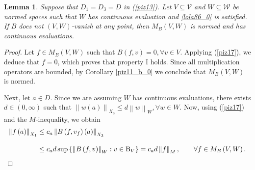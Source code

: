 \documentclass[14pt, a4paper]{article}  %
\newcounter{property}
\providecommand{\llave}[1]{\left\lbrace #1\right\rbrace }
\providecommand{\pare}[1]{\left( #1\right) }
\providecommand{\norm}[1]{\left\lVert#1\right\rVert}
\newcommand{\B}{\textup{B}}
\newcommand{\V}{\mathcal{V}}
\newcommand{\W}{\mathcal{W}}
\newtheorem{lemma}{Lemma}[section]
\begin{document}
\begin{lemma}\label{d339_0}
	Suppose that $D_{1} = D_{3} = D$ in (\ref{piz13}). Let $V \subseteq \V$ and $W \subseteq \W$ be normed spaces such that $W$ has continuous evaluation  and  \ref{lola86_0} is satisfied. If $B$ does not  $\pare{V,W}$-vanish at any point, 
	then    $M_{B}\pare{V,W}$ is normed and  has continuous evaluations. 
\end{lemma}
\begin{proof} 
	Let  $f\in M_{B}\pare{V,W}$ such that $B\pare{f,v}=0,\forall v\in V$. Applying (\ref{piz17}), we deduce that $f=0$, which proves that property I holds. Since all multiplication operators are bounded, by Corollary \ref{piz11_b_0}  we conclude that    $M_{B}\pare{V,W}$ is normed.
	
	Next, let $a\in D$. Since we are assuming $W$  has continuous evaluations, there exists $d\in \pare{0,\infty}$ such that $\norm{w\pare{a}}_{X_{3}}\leq d\norm{w}_{W}, \forall w\in W. $
	Now, using  (\ref{piz17}) and the $M$-inequality, we obtain \setlength{\belowdisplayskip}{-8pt} 
	\begin{align*}
	\norm{f\pare{a}}_{X_{1}}& \leq c_{a} \norm{B\pare{f,v_{f}}\pare{a}}_{X_{3}}\\[.3 cm]
	& \leq c_{a}d\sup\llave{\norm{B\pare{f,v}}_{W}:v\in \B_{V}}= c_{a}d\norm{f}_{M},\qquad  \forall f\in M_{B}\pare{V,W}.
	\end{align*} 	 
\end{proof} 

 
\end{document}
